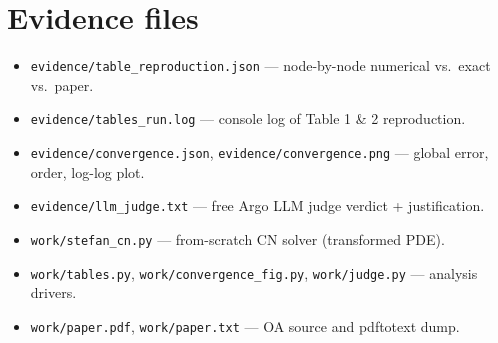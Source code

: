 \documentclass[11pt]{article}
\begin{document}
\section*{Evidence files}
\begin{itemize}
  \item \texttt{evidence/table\_reproduction.json} --- node-by-node numerical vs.\ exact vs.\ paper.
  \item \texttt{evidence/tables\_run.log} --- console log of Table 1 \& 2 reproduction.
  \item \texttt{evidence/convergence.json}, \texttt{evidence/convergence.png} --- global error, order, log-log plot.
  \item \texttt{evidence/llm\_judge.txt} --- free Argo LLM judge verdict + justification.
  \item \texttt{work/stefan\_cn.py} --- from-scratch CN solver (transformed PDE).
  \item \texttt{work/tables.py}, \texttt{work/convergence\_fig.py}, \texttt{work/judge.py} --- analysis drivers.
  \item \texttt{work/paper.pdf}, \texttt{work/paper.txt} --- OA source and pdftotext dump.
\end{itemize}
\end{document}
